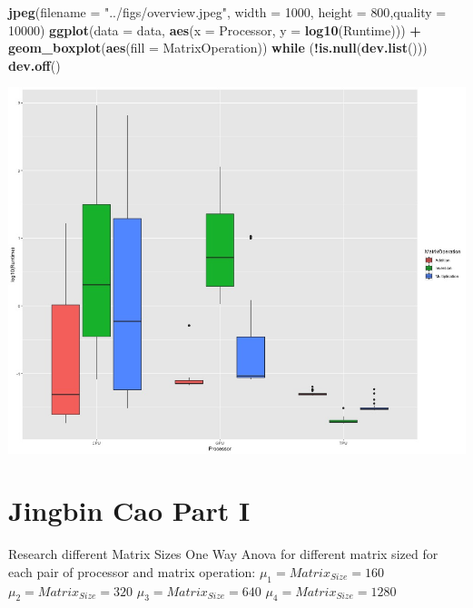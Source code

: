 \documentclass[
]{article}
\newenvironment{Shaded}{\begin{snugshade}}{\end{snugshade}}
\newcommand{\ControlFlowTok}[1]{\textcolor[rgb]{0.13,0.29,0.53}{\textbf{#1}}}
\newcommand{\DataTypeTok}[1]{\textcolor[rgb]{0.13,0.29,0.53}{#1}}
\newcommand{\DecValTok}[1]{\textcolor[rgb]{0.00,0.00,0.81}{#1}}
\newcommand{\KeywordTok}[1]{\textcolor[rgb]{0.13,0.29,0.53}{\textbf{#1}}}
\newcommand{\NormalTok}[1]{#1}
\newcommand{\OperatorTok}[1]{\textcolor[rgb]{0.81,0.36,0.00}{\textbf{#1}}}
\newcommand{\StringTok}[1]{\textcolor[rgb]{0.31,0.60,0.02}{#1}}
\begin{document}
\begin{Shaded}
\begin{Highlighting}[]
\KeywordTok{jpeg}\NormalTok{(}\DataTypeTok{filename =} \StringTok{"../figs/overview.jpeg"}\NormalTok{, }\DataTypeTok{width =} \DecValTok{1000}\NormalTok{, }\DataTypeTok{height =} \DecValTok{800}\NormalTok{,}\DataTypeTok{quality =} \DecValTok{10000}\NormalTok{)}
\KeywordTok{ggplot}\NormalTok{(}\DataTypeTok{data =}\NormalTok{ data, }\KeywordTok{aes}\NormalTok{(}\DataTypeTok{x =}\NormalTok{ Processor, }\DataTypeTok{y =} \KeywordTok{log10}\NormalTok{(Runtime))) }\OperatorTok{+}
\KeywordTok{geom\_boxplot}\NormalTok{(}\KeywordTok{aes}\NormalTok{(}\DataTypeTok{fill =}\NormalTok{ MatrixOperation))}
\ControlFlowTok{while}\NormalTok{ (}\OperatorTok{!}\KeywordTok{is.null}\NormalTok{(}\KeywordTok{dev.list}\NormalTok{()))  }\KeywordTok{dev.off}\NormalTok{()}
\end{Highlighting}
\end{Shaded}

\begin{center}\includegraphics[width=0.9\linewidth]{../figs/overview} \end{center}

\hypertarget{jingbin-cao-part-i}{%
\section{Jingbin Cao Part I}\label{jingbin-cao-part-i}}

Research different Matrix Sizes One Way Anova for different matrix sized
for each pair of processor and matrix operation:
\(\mu_1 = Matrix_{Size}=160\) \(\mu_2 = Matrix_{Size}=320\)
\(\mu_3 = Matrix_{Size}=640\) \(\mu_4 = Matrix_{Size}=1280\)
\end{document}
